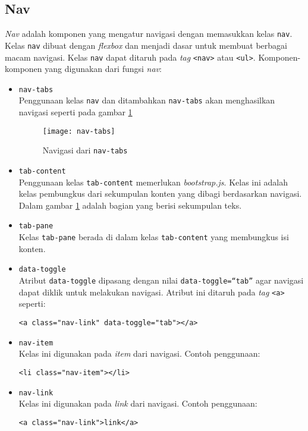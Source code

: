 \subsection{Nav}
\textit{Nav} adalah komponen yang mengatur navigasi dengan memasukkan kelas \texttt{nav}. Kelas \texttt{nav} dibuat dengan \textit{flexbox} dan menjadi dasar untuk membuat berbagai macam navigasi. Kelas \texttt{nav} dapat ditaruh pada \textit{tag} \texttt{<nav>} atau \texttt{<ul>}. Komponen-komponen yang digunakan dari fungsi \textit{nav}:
\begin{itemize}
	\item \texttt{nav-tabs} \\
	Penggunaan kelas \texttt{nav} dan ditambahkan \texttt{nav-tabs} akan menghasilkan navigasi seperti pada gambar \ref{fig:nav-tabs}
	\begin{figure}[H]
		\centering
		\texttt{[image: nav-tabs]} 
		\caption{Navigasi dari \texttt{nav-tabs}}
		\label{fig:nav-tabs} 
	\end{figure}

	\item \texttt{tab-content} \\
	Penggunaan kelas \texttt{tab-content} memerlukan \textit{bootstrap.js}. Kelas ini adalah kelas pembungkus dari sekumpulan konten yang dibagi berdasarkan navigasi. Dalam gambar \ref{fig:nav-tabs} adalah bagian yang berisi sekumpulan teks.
	
	\item \texttt{tab-pane} \\
	Kelas \texttt{tab-pane} berada di dalam kelas \texttt{tab-content} yang membungkus isi konten. 
	
	\item \texttt{data-toggle} \\ 
	Atribut \texttt{data-toggle} dipasang dengan nilai \texttt{data-toggle=``tab''} agar navigasi dapat diklik untuk melakukan navigasi. Atribut ini ditaruh pada \textit{tag} \texttt{<a>} seperti:
	\begin{lstlisting}
<a class="nav-link" data-toggle="tab"></a>
	\end{lstlisting}
	
	\item \texttt{nav-item} \\
	Kelas ini digunakan pada \textit{item} dari navigasi. Contoh penggunaan:
	\begin{lstlisting}
<li class="nav-item"></li>
	\end{lstlisting}
	
	\item \texttt{nav-link} \\
	Kelas ini digunakan pada \textit{link} dari navigasi. Contoh penggunaan:
	\begin{lstlisting}
<a class="nav-link">link</a>	
	\end{lstlisting}
\end{itemize}

